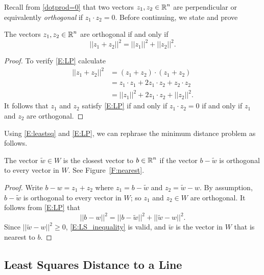 \documentclass{ximera}
\begin{document}
Recall from \eqref{dotprod=0} that two vectors $z_1,z_2\in\mbox{$\mathbb{R}$}^n$ are perpendicular 
or equivalently {\em orthogonal} if $z_1\cdot z_2 = 0$.  Before continuing, we state and prove 
\begin{lemma}   \label{L:LP}
The vectors $z_1,z_2\in\mbox{$\mathbb{R}$}^n$ are orthogonal if and only if  
\begin{equation} \label{E:LP}
||z_1+z_2||^2 = ||z_1||^2 + ||z_2||^2.
\end{equation}
\end{lemma}

\begin{proof}
To verify \eqref{E:LP} calculate 
\begin{align*}
  ||z_1+z_2||^2&=(z_1+z_2)\cdot(z_1+z_2) \\
  &=z_1\cdot z_1 +2z_1\cdot z_2+z_2\cdot z_2 \\
  &=||z_1||^2 + 2z_1\cdot z_2 +||z_2||^2.
\end{align*}
It follows that $z_1$ and $z_2$ satisfy \eqref{E:LP} if and only if $z_1\cdot z_2 = 0$  
if and only if $z_1$ and $z_2$ are orthogonal.
\end{proof}

Using \eqref{E:leastsq} and \eqref{E:LP}, we can rephrase the minimum distance 
problem as follows.
\begin{lemma}  \label{L:orthoLSA}
The vector $\tilde{w}\in W$ is the closest vector to $b\in\mbox{$\mathbb{R}$}^n$ if the vector 
$b - \tilde{w}$ is orthogonal to every vector in $W$. See Figure~\ref{F:nearest}.
\end{lemma}

\begin{proof}  Write $b-w=z_1+z_2$ where $z_1=b-\tilde{w}$ and $z_2=\tilde{w}-w$.  By 
assumption, $b-\tilde{w}$ is orthogonal to every vector in $W$; so $z_1$ and 
$z_2\in W$ are orthogonal.  It follows from \eqref{E:LP} that
\[
||b-w||^2 = ||b-\tilde{w}||^2 + ||\tilde{w}-w||^2.
\]
Since $||\tilde{w}-w||^2\ge 0$, \eqref{E:LS_inequality} is valid, and $\tilde{w}$ is the 
vector in $W$ that is nearest to $b$. 
\end{proof}

\subsection*{Least Squares Distance to a Line}
\end{document}

